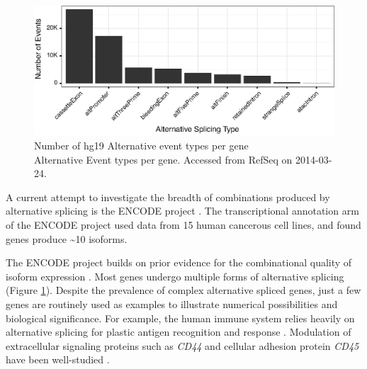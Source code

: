     \begin{figure} %
      \centering 
      \includegraphics{Figures/Intro/ASEventTypesPlot.eps}
      \caption[Number of hg19 Alternative Event types]
      {
        Number of hg19 Alternative event types per gene\\[0.25cm]
        Alternative Event types per gene. Accessed from RefSeq on 2014-03-24.
        }
      \label{Intro:fig:asEventsBarChart}
      \end{figure}

    A current attempt to investigate the breadth of combinations produced by alternative splicing is the ENCODE project \citep{Birney2007,Dunham2012}. The transcriptional annotation arm of the ENCODE project \citep{Djebali2012,Derrien2012} used data from 15 human cancerous cell lines, and found genes produce \textasciitilde10 isoforms.

    The ENCODE project builds on prior evidence for the combinational quality of isoform expression \citep{Wang2008,Pan2008}. Most genes undergo multiple forms of alternative splicing (Figure \ref{Intro:fig:asEventsBarChart}). Despite the prevalence of complex alternative spliced genes, just a few genes are routinely used as examples to illustrate numerical possibilities and biological significance. For example, the human immune system relies heavily on alternative splicing for plastic antigen recognition and response \citep{Lynch2004}. Modulation of extracellular signaling proteins such as \textit{CD44} and cellular adhesion protein \textit{CD45} have been well-studied \citep{Zikherman2008,Ponta2003}.

